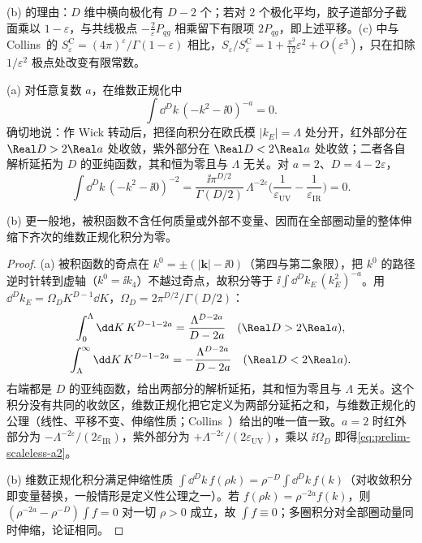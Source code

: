 (b) 的理由：$D$ 维中横向极化有 $D-2$ 个；若对 $2$ 个极化平均，胶子道部分子截面乘以 $1-\varepsilon$，与共线极点 $-\frac2\varepsilon P_{qg}$ 相乘留下有限项 $2P_{qg}$，即上述平移。(c) 中与 Collins~\cite{Collins2011}的 $S_\varepsilon^{\mathrm C}=(4\pi)^\varepsilon/\Gamma(1-\varepsilon)$ 相比，$S_\varepsilon/S^{\mathrm C}_\varepsilon=1+\frac{\pi^2}{12}\varepsilon^2+O(\varepsilon^3)$，只在扣除 $1/\varepsilon^2$ 极点处改变有限常数。%

\begin{lemma}[无标度积分为零]\label{lem:prelim-scaleless}
(a) 对任意复数 $a$，在维数正规化中
\begin{equation}\label{eq:prelim-scaleless}
\int\dd^Dk\,(-k^2-\ii0)^{-a}=0 .
\end{equation}
确切地说：作 Wick 转动后，把径向积分在欧氏模 $|k_E|=\Lambda$ 处分开，红外部分在 $\Real D>2\Real a$ 处收敛，紫外部分在 $\Real D<2\Real a$ 处收敛；二者各自解析延拓为 $D$ 的亚纯函数，其和恒为零且与 $\Lambda$ 无关。对 $a=2$、$D=4-2\varepsilon$，
\begin{equation}\label{eq:prelim-scaleless-a2}
\int\dd^Dk\,(-k^2-\ii0)^{-2}=\frac{\ii\pi^{D/2}}{\Gamma(D/2)}\,\Lambda^{-2\varepsilon}\Big(\frac1{\varepsilon_{\mathrm{UV}}}-\frac1{\varepsilon_{\mathrm{IR}}}\Big)=0 .
\end{equation}
\par
(b) 更一般地，被积函数不含任何质量或外部不变量、因而在全部圈动量的整体伸缩下齐次的维数正规化积分为零。
\end{lemma}

\begin{proof}
(a) 被积函数的奇点在 $k^0=\pm(|\mathbf k|-\ii0)$（第四与第二象限），把 $k^0$ 的路径逆时针转到虚轴（$k^0=\ii k_4$）不越过奇点，故积分等于 $\ii\int\dd^Dk_E\,(k_E^2)^{-a}$。用 $\dd^Dk_E=\Omega_DK^{D-1}\dd K$，$\Omega_D=2\pi^{D/2}/\Gamma(D/2)$：
\begin{gather*}
\int_0^\Lambda\dd K\,K^{D-1-2a}=\frac{\Lambda^{D-2a}}{D-2a}\quad(\Real D>2\Real a),\\
\int_\Lambda^\infty\dd K\,K^{D-1-2a}=-\frac{\Lambda^{D-2a}}{D-2a}\quad(\Real D<2\Real a).
\end{gather*}
右端都是 $D$ 的亚纯函数，给出两部分的解析延拓，其和恒为零且与 $\Lambda$ 无关。这个积分没有共同的收敛区，维数正规化把它定义为两部分延拓之和，与维数正规化的公理（线性、平移不变、伸缩性质；Collins~\cite[第~4.1~节]{Collins1984}）给出的唯一值一致。$a=2$ 时红外部分为 $-\Lambda^{-2\varepsilon}/(2\varepsilon_{\mathrm{IR}})$，紫外部分为 $+\Lambda^{-2\varepsilon}/(2\varepsilon_{\mathrm{UV}})$，乘以 $\ii\Omega_D$ 即得\cref{eq:prelim-scaleless-a2}。

(b) 维数正规化积分满足伸缩性质 $\int\dd^Dk\,f(\rho k)=\rho^{-D}\int\dd^Dk\,f(k)$（对收敛积分即变量替换，一般情形是定义性公理之一）。若 $f(\rho k)=\rho^{-2a}f(k)$，则 $(\rho^{-2a}-\rho^{-D})\int f=0$ 对一切 $\rho>0$ 成立，故 $\int f\equiv0$；多圈积分对全部圈动量同时伸缩，论证相同。
\end{proof}

